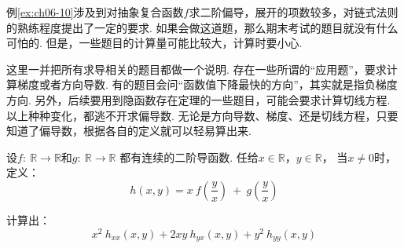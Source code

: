 例\ref{ex:ch06-10}涉及到对抽象复合函数$f$求二阶偏导，展开的项数较多，对链式法则的熟练程度提出了一定的要求.
如果会做这道题，那么期末考试的题目就没有什么可怕的.
但是，一些题目的计算量可能比较大，计算时要小心.

这里一并把所有求导相关的题目都做一个说明.
存在一些所谓的“应用题”，要求计算梯度或者方向导数.
有的题目会问“函数值下降最快的方向”，其实就是指负梯度方向.
另外，后续要用到隐函数存在定理的一些题目，可能会要求计算切线方程.
以上种种变化，都逃不开求偏导数.
无论是方向导数、梯度、还是切线方程，只要知道了偏导数，根据各自的定义就可以轻易算出来.

\begin{example}[2021]
\label{ex:ch06-11}
设$f:~\mathbb{R} \to \mathbb{R}$和$g:~\mathbb{R} \to \mathbb{R}$
都有连续的二阶导函数. 任给$x \in \mathbb{R}$，$y \in \mathbb{R}$，
当$x \ne 0$时，定义：
$$
h(x,y) = x~f\left(\frac{y}{x}\right) ~+~ g\left(\frac{y}{x}\right)
$$

计算出：
$$
x^2 ~h_{xx}(x,y) + 2xy~ h_{yx}(x,y) + y^2 ~h_{yy}(x,y)
$$
\end{example}


